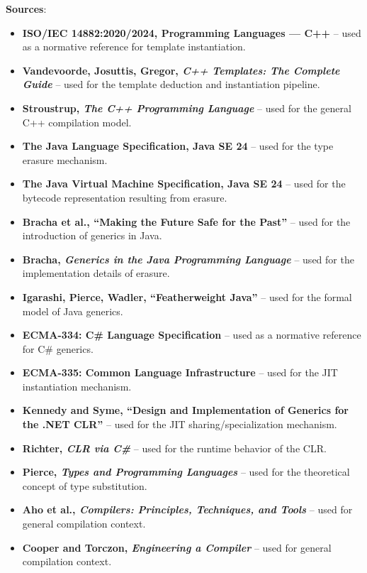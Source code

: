 \documentclass[11pt]{report}
\begin{document}
\vspace{0.5em}
\noindent\textbf{Sources}:
\begin{itemize}
    \item \textbf{ISO/IEC 14882:2020/2024, Programming Languages --- C++} \cite{iso_cpp2024} -- used as a normative reference for template instantiation.
    \item \textbf{Vandevoorde, Josuttis, Gregor, \emph{C++ Templates: The Complete Guide}} \cite{cpp_templates2017} -- used for the template deduction and instantiation pipeline.
    \item \textbf{Stroustrup, \emph{The C++ Programming Language}} \cite{stroustrup2013} -- used for the general C++ compilation model.
    \item \textbf{The Java Language Specification, Java SE 24} \cite{jls2024} -- used for the type erasure mechanism.
    \item \textbf{The Java Virtual Machine Specification, Java SE 24} \cite{jvms2024} -- used for the bytecode representation resulting from erasure.
    \item \textbf{Bracha et al., ``Making the Future Safe for the Past''} \cite{bracha1998} -- used for the introduction of generics in Java.
    \item \textbf{Bracha, \emph{Generics in the Java Programming Language}} \cite{bracha2004} -- used for the implementation details of erasure.
    \item \textbf{Igarashi, Pierce, Wadler, ``Featherweight Java''} \cite{igarashi2001} -- used for the formal model of Java generics.
    \item \textbf{ECMA-334: C\# Language Specification} \cite{ecma334_2023} -- used as a normative reference for C\# generics.
    \item \textbf{ECMA-335: Common Language Infrastructure} \cite{ecma335_2024} -- used for the JIT instantiation mechanism.
    \item \textbf{Kennedy and Syme, ``Design and Implementation of Generics for the .NET CLR''} \cite{kennedy2001} -- used for the JIT sharing/specialization mechanism.
    \item \textbf{Richter, \emph{CLR via C\#}} \cite{richter2012} -- used for the runtime behavior of the CLR.
    \item \textbf{Pierce, \emph{Types and Programming Languages}} \cite{pierce2002} -- used for the theoretical concept of type substitution.
    \item \textbf{Aho et al., \emph{Compilers: Principles, Techniques, and Tools}} \cite{aho2022} -- used for general compilation context.
    \item \textbf{Cooper and Torczon, \emph{Engineering a Compiler}} \cite{cooper2022} -- used for general compilation context.
\end{itemize}
\end{document}
